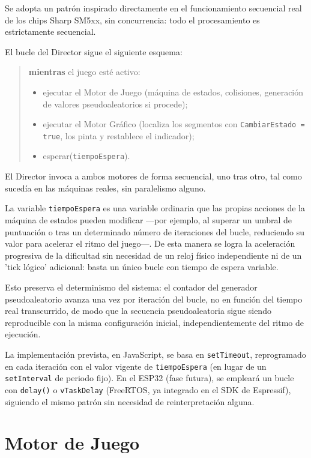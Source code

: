 \documentclass[../main.tex]{subfiles}
\begin{document}
	Se adopta un patrón inspirado directamente en el funcionamiento secuencial real de los chips Sharp SM5xx, sin concurrencia: todo el procesamiento es estrictamente secuencial.

	El bucle del Director sigue el siguiente esquema:

	\begin{quote}
		\textbf{mientras} el juego esté activo:
		\begin{itemize}
			\item ejecutar el Motor de Juego (máquina de estados, colisiones, generación de valores pseudoaleatorios si procede);
			\item ejecutar el Motor Gráfico (localiza los segmentos con \texttt{CambiarEstado = true}, los pinta y restablece el indicador);
			\item esperar(\texttt{tiempoEspera}).
		\end{itemize}
	\end{quote}

	El Director invoca a ambos motores de forma secuencial, uno tras otro, tal como sucedía en las máquinas reales, sin paralelismo alguno.

	La variable \texttt{tiempoEspera} es una variable ordinaria que las propias acciones de la máquina de estados pueden modificar —por ejemplo, al superar un umbral de puntuación o tras un determinado número de iteraciones del bucle, reduciendo su valor para acelerar el ritmo del juego—. De esta manera se logra la aceleración progresiva de la dificultad sin necesidad de un reloj físico independiente ni de un 'tick lógico' adicional: basta un único bucle con tiempo de espera variable.

	Esto preserva el determinismo del sistema: el contador del generador pseudoaleatorio avanza una vez por iteración del bucle, no en función del tiempo real transcurrido, de modo que la secuencia pseudoaleatoria sigue siendo reproducible con la misma configuración inicial, independientemente del ritmo de ejecución.

	La implementación prevista, en JavaScript, se basa en \texttt{setTimeout}, reprogramado en cada iteración con el valor vigente de \texttt{tiempoEspera} (en lugar de un \texttt{setInterval} de periodo fijo). En el ESP32 (fase futura), se empleará un bucle con \texttt{delay()} o \texttt{vTaskDelay} (FreeRTOS, ya integrado en el SDK de Espressif), siguiendo el mismo patrón sin necesidad de reinterpretación alguna.

	\section{Motor de Juego}
	\label{sec:motor-juego}
\end{document}
